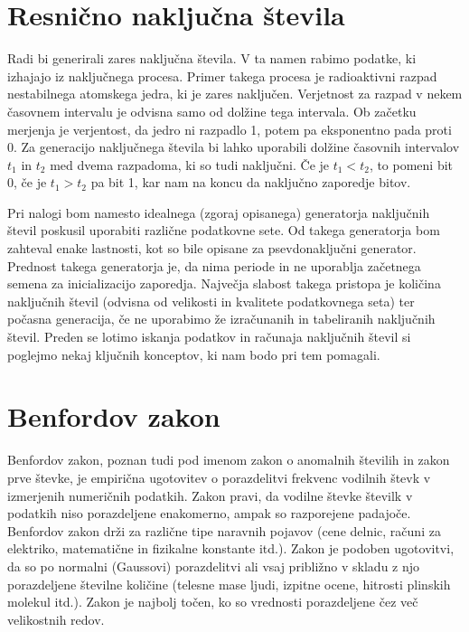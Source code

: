 \documentclass[11pt, oneside]{article}
\theoremstyle{definition}
\begin{document}
\section{Resnično naključna števila}
Radi bi generirali zares naključna števila. V ta namen rabimo podatke, ki izhajajo iz naključnega
procesa.
Primer takega procesa je radioaktivni razpad nestabilnega atomskega jedra, ki je zares naključen.
Verjetnost za razpad v nekem časovnem intervalu je odvisna samo od dolžine tega intervala.
Ob začetku merjenja je verjentost, da jedro ni razpadlo 1, potem pa eksponentno pada proti 0.
Za generacijo naključnega števila bi lahko uporabili dolžine časovnih intervalov $t_1$ in $t_2$
med dvema razpadoma, ki so tudi naključni. Če je $t_1 < t_2$, to pomeni bit 0, če je $t_1 > t_2$ pa bit 1,
kar nam na koncu da naključno zaporedje bitov.

Pri nalogi bom namesto idealnega (zgoraj opisanega) generatorja naključnih števil poskusil
uporabiti različne podatkovne sete. Od takega generatorja bom zahteval enake lastnosti, kot so bile opisane
za psevdonaključni generator. Prednost takega generatorja je, da nima periode in ne uporablja začetnega semena za
inicializacijo zaporedja. Največja slabost takega pristopa je količina naključnih števil (odvisna od
velikosti in kvalitete podatkovnega seta) ter počasna generacija, če ne uporabimo že izračunanih
in tabeliranih naključnih števil. Preden se lotimo iskanja podatkov in računaja naključnih števil si
poglejmo nekaj ključnih konceptov, ki nam bodo pri tem pomagali.

\section{Benfordov zakon}
Benfordov zakon, poznan tudi pod imenom zakon o anomalnih številih in zakon prve števke, je empirična
ugotovitev o porazdelitvi frekvenc vodilnih števk v izmerjenih numeričnih podatkih.
Zakon pravi, da vodilne števke številk v podatkih niso porazdeljene enakomerno, ampak so razporejene
padajoče. Benfordov zakon drži za različne tipe naravnih pojavov (cene delnic, računi za elektriko, matematične in fizikalne konstante itd.).
Zakon je podoben ugotovitvi, da  so po normalni (Gaussovi) porazdelitvi ali vsaj približno v skladu z njo porazdeljene številne količine
(telesne mase ljudi, izpitne ocene, hitrosti plinskih molekul itd.).
Zakon je najbolj točen, ko so vrednosti porazdeljene čez več velikostnih redov.
\end{document}
